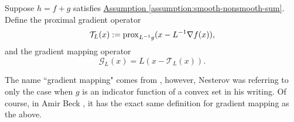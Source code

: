 \documentclass[12pt]{article}
\begin{document}
 
    \begin{definition}
        \label{def:gradient_mapping}
        Suppose $h = f + g$ satisfies 
        \hyperref[assumption:smooth-nonsmooth-sum]{Assumption \ref*{assumption:smooth-nonsmooth-sum}}. 
        Define the proximal gradient operator
        $$
            \mathcal T_L(x) := \operatorname{prox}_{L^{-1}g}(x - L^{-1}\nabla f(x)),
        $$
        and the gradient mapping operator
        $$
            \mathcal G_L(x) = L(x - \mathcal T_L(x)). 
        $$
    \end{definition}
    \begin{remark}
        The name ``gradient mapping" comes from \cite[(2.2.54)]{nesterov_lectures_2018}, however, Nesterov was referring to only the case when $g$ is an indicator function of a convex set in his writing. 
        Of course, in Amir Beck \cite[10.3.2]{beck_first-order_nodate}, it has the exact same definition for gradient mapping as the above. 
    \end{remark}
\end{document}
